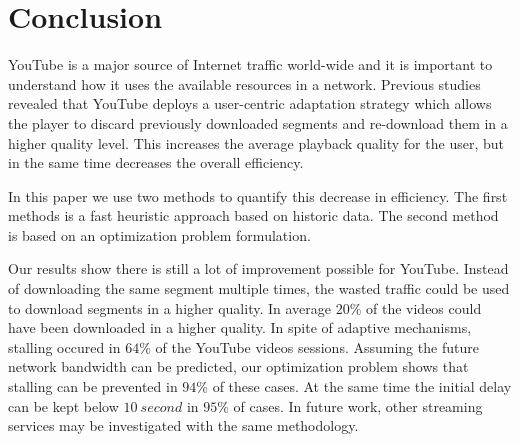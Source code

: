 
\section{Conclusion}
\label{sec:conclusion}

YouTube is a major source of Internet traffic world-wide and it is important to understand how it uses the available resources in a network.
Previous studies revealed that YouTube deploys a user-centric adaptation strategy which allows the player to discard previously downloaded segments and re-download them in a higher quality level.
This increases the average playback quality for the user, but in the same time decreases the overall efficiency.

In this paper we use two methods to quantify this decrease in efficiency.
The first methods is a fast heuristic approach based on historic data.
The second method is based on an optimization problem formulation.

Our results show there is still a lot of improvement possible for YouTube. Instead of downloading the same segment multiple times, the wasted traffic could be used to download segments in a higher quality. In average $20\%$ of the videos could have been downloaded in a higher quality. In spite of adaptive mechanisms, stalling occured in $64\%$ of the YouTube videos sessions. Assuming the future network bandwidth can be predicted, our optimization problem shows that stalling can be prevented in $94\%$ of these cases. At the same time the initial delay can be kept below $\SI{10}{second}$ in $95\%$ of cases. In future work, other streaming services may be investigated with the same methodology.